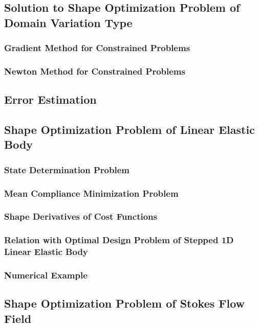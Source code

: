 \documentclass[oneside]{book}
\numberwithin{equation}{section}
\begin{document}
\subsection{Solution to Shape Optimization Problem of Domain Variation Type}

\subsubsection{Gradient Method for Constrained Problems}

\subsubsection{Newton Method for Constrained Problems}

\subsection{Error Estimation}

\subsection{Shape Optimization Problem of Linear Elastic Body}

\subsubsection{State Determination Problem}

\subsubsection{Mean Compliance Minimization Problem}

\subsubsection{Shape Derivatives of Cost Functions}

\subsubsection{Relation with Optimal Design Problem of Stepped 1D Linear Elastic Body}

\subsubsection{Numerical Example}

\subsection{Shape Optimization Problem of Stokes Flow Field}
\end{document}
